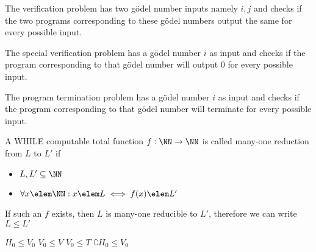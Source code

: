     The verification problem has two gödel number inputs namely $i, j$ and checks if the two programs corresponding to these gödel numbers output the same
    for every possible input.\newline

    The special verification problem has a gödel number $i$ as input and checks if the program corresponding to that gödel number will output
    0 for every possible input.\newline

    The program termination problem has a gödel number $i$ as input and checks if the program corresponding to that gödel number will terminate
    for every possible input.\newline

    A WHILE computable total function $f: \NN \rightarrow \NN$ is called many-one reduction from $L$ to $L'$ if
    \begin{itemize}
        \item $L, L' \subseteq \NN$
        \item $\forall x \elem \NN: x \elem L \iff f(x) \elem L'$
    \end{itemize}
    If such an $f$ exists, then $L$ is many-one reducible to $L'$, therefore we can write $L \leq L'$\newline

    $H_0 \leq V_0$\newline
    $V_0 \leq V$\newline
    $V_0 \leq T$\newline
    $\complement{H_0} \leq V_0$\newline